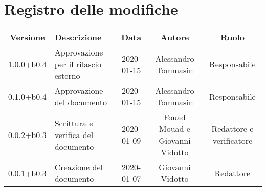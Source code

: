 \section*{Registro delle modifiche}

\begin{center}
	\begin{longtable}{|c|p{3cm}|c|c|c|}
	\hline
	\rowcolor{lighter-grayer}
	\textbf{Versione} & \textbf{Descrizione} & \textbf{Data} & \textbf{Autore} & \textbf{Ruolo} \\
	\hline
	\endfirsthead


	1.0.0+b0.4 & Approvazione per il rilascio esterno & 2020-01-15 & Alessandro Tommasin & Responsabile \\
	\hline
	0.1.0+b0.4 & Approvazione del documento & 2020-01-15 & Alessandro Tommasin & Responsabile \\
	\hline
	0.0.2+b0.3 & Scrittura e verifica del documento & 2020-01-09 & Fouad Mouad e Giovanni Vidotto & Redattore e verificatore \\
	\hline
	0.0.1+b0.3 & Creazione del documento & 2020-01-07 & Giovanni Vidotto & Redattore \\
	\hline

	\end{longtable}
\end{center}